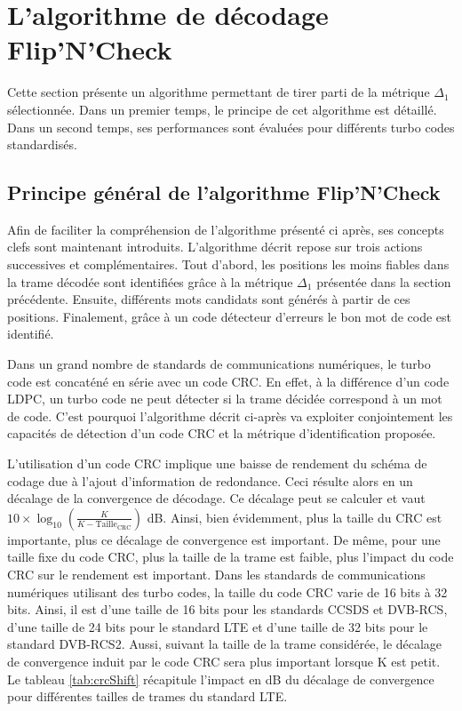 \section{L'algorithme de décodage Flip'N'Check}
Cette section présente un algorithme permettant de tirer parti de la métrique $\Delta_1$ sélectionnée.
Dans un premier temps, le principe de cet algorithme est détaillé. Dans un second temps, ses performances sont évaluées 
pour différents turbo codes standardisés.


\subsection{Principe général de l'algorithme Flip'N'Check}
Afin de faciliter la compréhension de l'algorithme présenté ci après, ses concepts clefs sont maintenant introduits.
L'algorithme décrit repose sur trois actions successives et complémentaires. Tout d'abord, les positions les moins fiables dans la trame 
décodée sont identifiées grâce à la métrique $\Delta_1$ présentée dans la section précédente. Ensuite, différents mots candidats sont générés
à partir de ces positions. Finalement, grâce à un code détecteur d'erreurs le bon mot de code est identifié.

Dans un grand nombre de standards de communications numériques, le turbo code est concaténé en série avec un code CRC. En 
effet, à la différence d'un code LDPC, un turbo code ne peut détecter si la trame décidée correspond à un mot de code. 
C'est pourquoi l'algorithme  décrit ci-après va exploiter conjointement les capacités de détection d'un code CRC et la métrique 
d'identification proposée.

L'utilisation d'un code CRC implique une baisse de rendement du schéma de codage due à l'ajout d'information de redondance. Ceci résulte alors 
en un décalage de la convergence de décodage. Ce décalage peut se calculer et vaut $10\times \log_{10}\left(\frac{K}{K-\text{Taille}_\text{CRC}}\right)$ dB.
Ainsi, bien évidemment, plus la taille du CRC est importante, plus ce décalage de convergence est important. De même,
pour une taille fixe du code CRC, plus la taille de la trame est faible, plus l'impact du code CRC sur le rendement est 
important. Dans les 
standards de communications numériques utilisant des turbo codes, la taille du code CRC varie de 16 bits à 32 bits.
Ainsi, il est d'une taille de 16 bits pour les standards CCSDS et DVB-RCS, d'une taille de 24 bits pour le standard LTE et d'une taille
de 32 bits pour le standard DVB-RCS2. Aussi, suivant la taille de la trame considérée, le décalage de convergence induit par le code 
CRC sera plus important lorsque K est petit. Le tableau \ref{tab:crcShift} récapitule l'impact en dB du décalage de convergence
pour différentes tailles de trames du standard LTE. 

